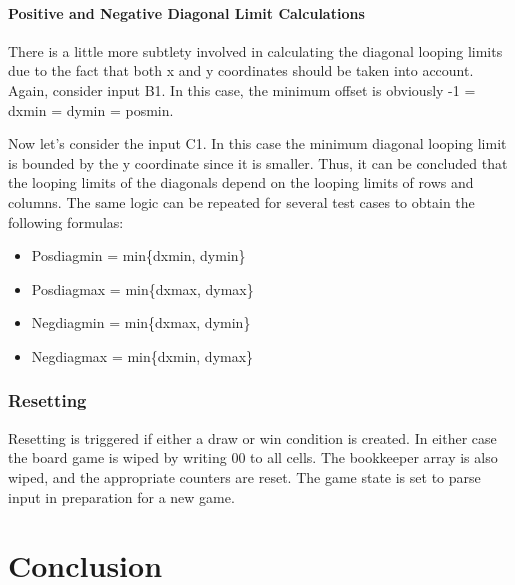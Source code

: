 \documentclass[conference]{IEEEtran}
\begin{document}
\paragraph{Positive and Negative Diagonal Limit Calculations}
There is a little more subtlety involved in calculating the diagonal looping limits due to the fact that both x and y coordinates should be taken into account. Again, consider input B1. In this case, the minimum offset is obviously  -1  = dxmin = dymin = posmin. \\ 
\par Now let’s consider the input C1. In this case the minimum diagonal looping limit is bounded by the y coordinate since it is smaller. Thus, it can be concluded that the looping limits of the diagonals depend on the looping limits of rows and columns. The same logic can be repeated for several test cases to obtain the following formulas:
\begin{itemize}
\item Posdiagmin = min\{dxmin, dymin\}
\item Posdiagmax = min\{dxmax, dymax\}
\item Negdiagmin = min\{dxmax, dymin\}
\item Negdiagmax = min\{dxmin, dymax\}
\end{itemize} \hfill \hfill
\subsubsection{Resetting}
Resetting is triggered if either a draw or win condition is created. In either case the board game is wiped by writing 00 to all cells. The bookkeeper array is also wiped, and the appropriate counters are reset. The game state is set to parse input in preparation for a new game.
\section{Conclusion}



\end{document}
